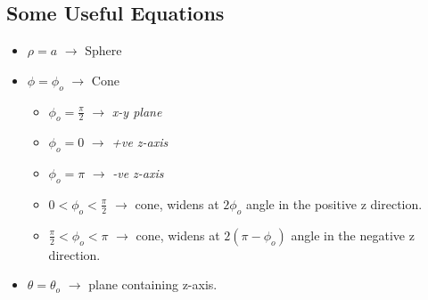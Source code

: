 \subsection{Some Useful Equations}
\label{ssec:some-useful-equations}
\begin{itemize}
  \item \(\rho=a\) \(\rightarrow\) Sphere
  \item \(\phi=\phi_o\) \(\rightarrow\) Cone
    \begin{itemize}
      \item \(\phi_o = \frac{\pi}{2}\) \(\rightarrow\) \emph{x-y plane}
      \item \(\phi_o = 0\) \(\rightarrow\) \emph{+ve z-axis}
      \item \(\phi_o = \pi\) \(\rightarrow\) \emph{-ve z-axis}
      \item \(0<\phi_o<\frac{\pi}{2}\) \(\rightarrow\) cone, widens at
        \(2\phi_o\) angle in the positive z direction.
      \item \(\frac{\pi}{2}<\phi_o<\pi\) \(\rightarrow\) cone, widens at
        \(2(\pi-\phi_o)\) angle in the negative z direction.
    \end{itemize}
  \item \(\theta=\theta_o\) \(\rightarrow\) plane containing z-axis.
\end{itemize}



